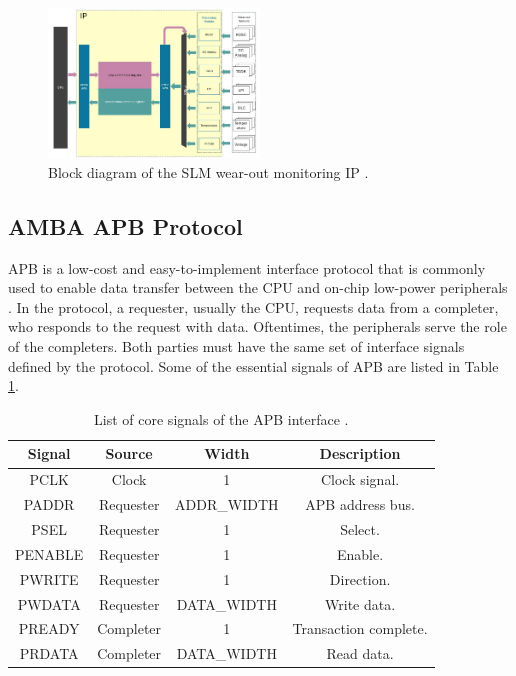 \documentclass[conference]{IEEEtran}
\begin{document}
\begin{figure}[h!]
    \centering
    \includegraphics[width = 0.5\textwidth]{figures/dut.jpg}
    \caption{Block diagram of the SLM wear-out monitoring IP \cite{Peng2024}.}
    \label{fig:dut}
\end{figure}
\subsection{AMBA APB Protocol}
APB is a low-cost and easy-to-implement interface protocol that is commonly used to enable data transfer between the CPU and on-chip low-power peripherals \cite{APB}. In the protocol, a requester, usually the CPU, requests data from a completer, who responds to the request with data. Oftentimes, the peripherals serve the role of the completers. Both parties must have the same set of interface signals defined by the protocol. Some of the essential signals of APB are listed in Table \ref{tab:apb}.

\begin{table}[h!]
    \caption{List of core signals of the APB interface \cite{APB}.}
    \centering
    \begin{tabular}{|c c c c|}
        \hline
        Signal & Source & Width & Description \\
        \hline
        PCLK & Clock & 1 & Clock signal. \\
        PADDR & Requester & ADDR\_WIDTH & APB address bus. \\
        PSEL & Requester & 1 & Select.  \\
        PENABLE & Requester & 1 & Enable. \\
        PWRITE & Requester & 1 & Direction. \\ 
        PWDATA & Requester & DATA\_WIDTH & Write data. \\
        PREADY & Completer & 1 & Transaction complete. \\
        PRDATA & Completer & DATA\_WIDTH & Read data. \\
        \hline  
    \end{tabular}
    \label{tab:apb}
\end{table}
\end{document}
